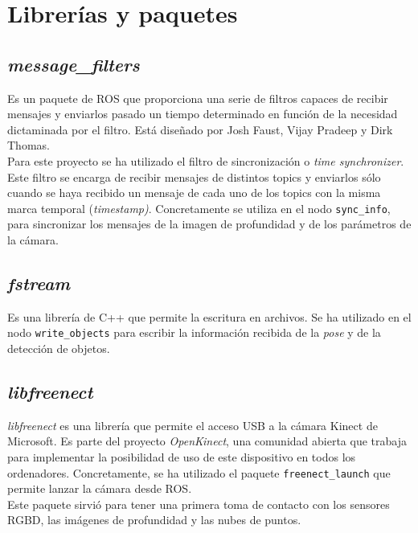 \section{Librerías y paquetes}

\subsection{\textit{message\_filters}}

Es un paquete de ROS que proporciona una serie de filtros capaces de recibir mensajes y enviarlos pasado un tiempo determinado en función de la necesidad dictaminada por el filtro. Está diseñado por Josh Faust, Vijay Pradeep y Dirk Thomas.\\

Para este proyecto se ha utilizado el filtro de sincronización o \textit{time synchronizer}. Este filtro se encarga de recibir mensajes de distintos topics y enviarlos sólo cuando se haya recibido un mensaje de cada uno de los topics con la misma marca temporal (\textit{timestamp)}. Concretamente se utiliza en el nodo \texttt{sync\_info}, para sincronizar los mensajes de la imagen de profundidad y de los parámetros de la cámara. \\ 

\subsection{\textit{fstream}}

Es una librería de C++ que permite la escritura en archivos. Se ha utilizado en el nodo \texttt{write\_objects} para escribir la información recibida de la \textit{pose} y de la detección de objetos.\\

\subsection{\textit{libfreenect}}

\textit{libfreenect} es una librería que permite el acceso USB a la cámara Kinect de Microsoft. Es parte del proyecto \textit{OpenKinect}, una comunidad abierta que trabaja para implementar la posibilidad de uso de este dispositivo en todos los ordenadores. Concretamente, se ha utilizado el paquete \texttt{freenect\_launch} que permite lanzar la cámara desde ROS.\\

Este paquete sirvió para tener una primera toma de contacto con los sensores RGBD, las imágenes de profundidad y las nubes de puntos.\\

